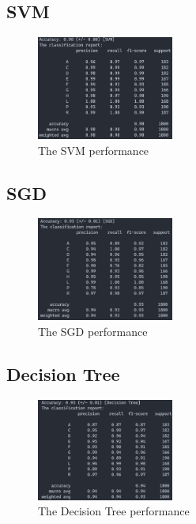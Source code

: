 \documentclass[11pt,en]{elegantpaper}
\begin{document}
\subsection*{SVM}
\begin{figure}[H]
	\centering
	\includegraphics[width=0.4\textwidth]{image/svmpf}
	\caption{The SVM performance}
	\label{svmpf}
\end{figure}

\subsection*{SGD}
\begin{figure}[H]
	\centering
	\includegraphics[width=0.4\textwidth]{image/sgdpf}
	\caption{The SGD performance}
	\label{sgdpf}
\end{figure}

\subsection*{Decision Tree}
\begin{figure}[H]
	\centering
	\includegraphics[width=0.4\textwidth]{image/dtpf}
	\caption{The Decision Tree performance}
	\label{dtpf}
\end{figure}
\end{document}
